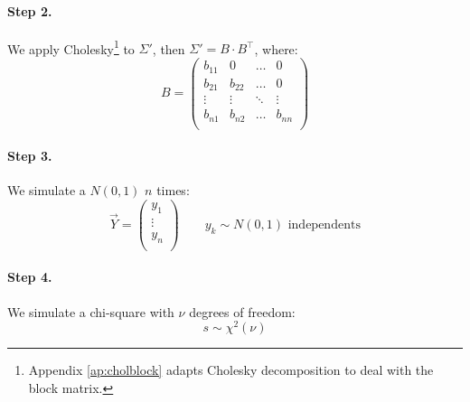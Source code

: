 \documentclass[a4paper,12pt,final]{article}
\begin{document}
\FloatBarrier

\paragraph{Step 2.} We apply Cholesky\footnote{Appendix \ref{ap:cholblock} adapts Cholesky 
decomposition to deal with the block matrix.} to $\Sigma'$, then $\Sigma' = B \cdot B^{\top}$, 
where:
\begin{displaymath}
B = 
\left(
\begin{array}{cccc}
b_{11}   & 0        & \ldots & 0       \\
b_{21}   & b_{22}   & \ldots & 0       \\
\vdots  & \vdots  & \ddots & \vdots    \\
b_{n1}   & b_{n2}   & \ldots & b_{nn}  \\
\end{array}
\right)
\end{displaymath}

\paragraph{Step 3.} We simulate a $N(0,1)$ $n$ times:
\begin{displaymath}
\vec{Y} =
\left(
\begin{array}{c}
y_1    \\
\vdots \\
y_n    \\
\end{array}
\right) 
\qquad y_k \sim N(0,1) \textrm{ independents}
\end{displaymath}

\paragraph{Step 4.} We simulate a chi-square with $\nu$ degrees of freedom:
\begin{displaymath}
s \sim \chi^2(\nu)
\end{displaymath}
\end{document}

